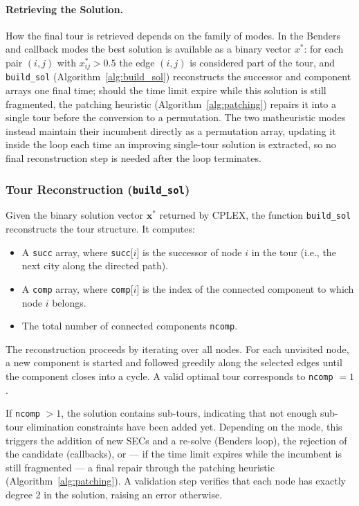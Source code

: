 \documentclass{article}
\begin{document}
\paragraph{Retrieving the Solution.}
How the final tour is retrieved depends on the family of modes. In the Benders and callback
modes the best solution is available as a binary vector $x^*$: for each pair $(i,j)$ with
$x^*_{ij} > 0.5$ the edge $(i,j)$ is considered part of the tour, and \texttt{build\_sol}
(Algorithm~\ref{alg:build_sol}) reconstructs the successor and component arrays one final
time; should the time limit expire while this solution is still fragmented, the patching
heuristic (Algorithm~\ref{alg:patching}) repairs it into a single tour before the conversion
to a permutation. The two matheuristic modes instead maintain their incumbent directly as a
permutation array, updating it inside the loop each time an improving single-tour solution
is extracted, so no final reconstruction step is needed after the loop terminates.

\subsubsection{Tour Reconstruction (\texttt{build\_sol})}

Given the binary solution vector $\mathbf{x}^*$ returned by CPLEX, the function
\texttt{build\_sol} reconstructs the tour structure. It computes:

\begin{itemize}
    \item A \texttt{succ} array, where \texttt{succ}[$i$] is the successor of node $i$ in
          the tour (i.e., the next city along the directed path).
    \item A \texttt{comp} array, where \texttt{comp}[$i$] is the index of the connected
          component to which node $i$ belongs.
    \item The total number of connected components \texttt{ncomp}.
\end{itemize}

The reconstruction proceeds by iterating over all nodes. For each unvisited node, a new
component is started and followed greedily along the selected edges until the component
closes into a cycle. A valid optimal tour corresponds to \texttt{ncomp} $= 1$.

If \texttt{ncomp} $> 1$, the solution contains sub-tours, indicating that not enough
sub-tour elimination constraints have been added yet. Depending on the mode, this triggers
the addition of new SECs and a re-solve (Benders loop), the rejection of the candidate
(callbacks), or --- if the time limit expires while the incumbent is still fragmented --- a
final repair through the patching heuristic (Algorithm~\ref{alg:patching}). A validation
step verifies that each node has exactly degree 2 in the solution, raising an error
otherwise.
\end{document}
